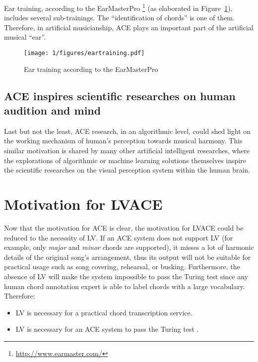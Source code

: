 Ear training, according to the EarMasterPro \footnote{\url{http://www.earmaster.com/}} (as elaborated in Figure~\ref{fig:1-eartraining}), includes several sub-trainings. The ``identification of chords'' is one of them. Therefore, in artificial musicianship, ACE plays an important part of the artificial musical ``ear''.
\begin{figure}[htb]
\centering
\texttt{[image: 1/figures/eartraining.pdf]}
\caption{Ear training according to the EarMasterPro}
\label{fig:1-eartraining}
\end{figure}

\subsection{ACE inspires scientific researches on human audition and mind}
Last but not the least, ACE research, in an algorithmic level, could shed light on the working mechanism of human's perception towards musical harmony. This similar motivation is shared by many other artificial intelligent researches\cite{lecun1995convolutional,hinton1995wake}, where the explorations of algorithmic or machine learning solutions themselves inspire the scientific researches on the visual perception system within the human brain.

\section{Motivation for LVACE} %
Now that the motivation for ACE is clear, the motivation for LVACE could be reduced to the necessity of LV. If an ACE system does not support LV (for example, only \textit{major} and \textit{minor} chords are supported), it misses a lot of harmonic details of the original song's arrangement, thus its output will not be suitable for practical usage such as song covering, rehearsal, or busking. Furthermore, the absence of LV will make the system impossible to pass the Turing test since any human chord annotation expert is able to label chords with a large vocabulary. Therefore:
\begin{itemize}
	\item LV is necessary for a practical chord transcription service.
	\item LV is necessary for an ACE system to pass the Turing test \cite{turing1950computing}.
\end{itemize}

